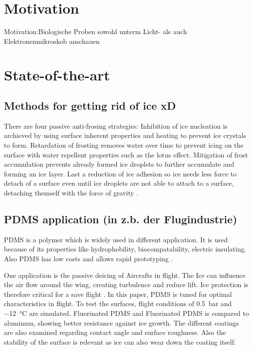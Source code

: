 
\section{Motivation}
Motivation:Biologische Proben sowohl unterm Licht- als auch Elektronenmikroskob anschauen

\section{State-of-the-art}

\subsection{Methods for getting rid of ice xD}

There are four passive anti-frosing strategies: Inhibition of ice nucleation is archieved by using surface inherent properties and heating to prevent ice crystals to form. Retardation of frosting removes water over time to prevent icing on the surface with water repellent properties such as the lotus effect. Mitigation of frost accumulation prevents already formed ice droplets to further accumulate and forming an ice layer. Last a reduction of ice adhesion so ice needs less force to detach of a surface even until ice droplets are not able to attach to a surface, detaching themself with the force of gravity \cite{Yang.2021}. 

\subsection{PDMS application (in z.b. der Flugindustrie)}

PDMS is a polymer which is widely used in different application. It is used because of its properties like hydrophobility, biocompatability, electric insulating. Also PDMS has low costs and allows rapid prototyping \cite{Wolf.2018}. 

One application is the passive deicing of Aircrafts in flight. The Ice can influence the air flow around the wing, creating turbulence and reduce lift. Ice protection is therefore critical for a save flight \cite{Liu.2018}. In this paper, PDMS is tuned for optimal characteristics in flight. To test the surfaces, flight conditions of \SI{0.5}{\bar} and \SI{-12}{\degreeCelsius} are simulated. Fluorinated PDMS and Fluorinated PDMS is compared to aluminum, showing better resistance against ice growth. The different coatings are also examined regarding contact angle and surface roughness. Also the stability of the surface is relevant as ice can also wear down the coating itself.  


